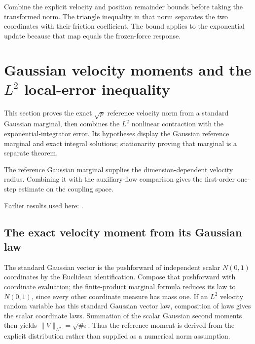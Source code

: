 \documentclass[11pt,a4paper]{report}
\begin{document}
Combine the explicit velocity and position remainder bounds before taking the transformed norm. The triangle inequality in that norm separates the two coordinates with their friction coefficient. The bound applies to the exponential update because that map equals the frozen-force response.

\section{\texorpdfstring{Gaussian velocity moments and the \(L^{2}\) local-error inequality}{Gaussian velocity moments and the L² local-error inequality}}
\label{proof-module-KineticLangevin-LpOneStep-lean}


This section proves the exact \(\sqrt p\) reference velocity norm from a standard Gaussian marginal, then combines the \(L^{2}\) nonlinear contraction with the exponential-integrator error. Its hypotheses display the Gaussian reference marginal and exact integral solutions; stationarity proving that marginal is a separate theorem.



The reference Gaussian marginal supplies the dimension-dependent velocity radius. Combining it with the auxiliary-flow comparison gives the first-order one-step estimate on the coupling space.



Earlier results used here: \cite[Section~3.24]{LangevinLean2026ULASC}.
\subsection{\texorpdfstring{The exact velocity moment from its Gaussian law}{The exact velocity moment from its Gaussian law}}
\label{report-step-KineticLangevin-LpOneStep-lean-1}


The standard Gaussian vector is the pushforward of independent scalar \(N(0,1)\) coordinates by the Euclidean identification. Compose that pushforward with coordinate evaluation; the finite-product marginal formula reduces its law to \(N(0,1)\), since every other coordinate measure has mass one. If an \(L^{2}\) velocity random variable has this standard Gaussian vector law, composition of laws gives the scalar coordinate laws. Summation of the scalar Gaussian second moments then yields \(\|V\|_{L^2}=\sqrt{\#\iota}\). Thus the reference moment is derived from the explicit distribution rather than supplied as a numerical norm assumption.
\end{document}
